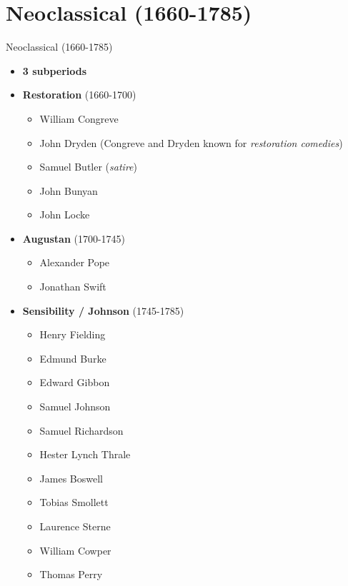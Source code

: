 \documentclass[
  12pt,
    progressbar=frametitle]{beamer}
\providecommand{\tightlist}{%
  \setlength{\itemsep}{0pt}\setlength{\parskip}{0pt}}
\begin{document}
\section{Neoclassical (1660-1785)}
\begin{frame}[allowframebreaks]
{Neoclassical (1660-1785)}
\begin{itemize}
\tightlist
\item
  \textbf{3 subperiods}
\item
  \textbf{Restoration} (1660-1700)

  \begin{itemize}
  \tightlist
  \item
    William Congreve
  \item
    John Dryden (Congreve and Dryden known for \emph{restoration
    comedies})
  \item
    Samuel Butler (\emph{satire})
  \item
    John Bunyan
  \item
    John Locke
  \end{itemize}
\item
  \textbf{Augustan} (1700-1745)

  \begin{itemize}
  \tightlist
  \item
    Alexander Pope
  \item
    Jonathan Swift
  \end{itemize}
\item
  \textbf{Sensibility / Johnson} (1745-1785)

  \begin{itemize}
  \tightlist
  \item
    Henry Fielding
  \item
    Edmund Burke
  \item
    Edward Gibbon
  \item
    Samuel Johnson
  \item
    Samuel Richardson
  \item
    Hester Lynch Thrale
  \item
    James Boswell
  \item
    Tobias Smollett
  \item
    Laurence Sterne
  \item
    William Cowper
  \item
    Thomas Perry
  \end{itemize}
\end{itemize}
\end{frame}
\end{document}
